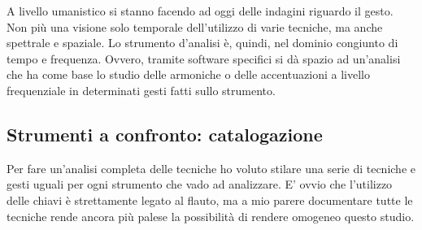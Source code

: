 A livello umanistico si stanno facendo ad oggi delle indagini riguardo il gesto.
Non più una visione solo temporale dell’utilizzo di varie tecniche, ma anche
spettrale e spaziale. Lo strumento d’analisi è, quindi, nel dominio congiunto
di tempo e frequenza. Ovvero, tramite software specifici si dà spazio ad
un’analisi che ha come base lo studio delle armoniche o delle accentuazioni a
livello frequenziale in determinati gesti fatti sullo strumento.

\subsection{Strumenti a confronto: catalogazione}

Per fare un’analisi completa delle tecniche ho voluto stilare una serie di
tecniche e gesti uguali per ogni strumento che vado ad analizzare. E’ ovvio che
l’utilizzo delle chiavi è strettamente legato al flauto, ma a mio parere
documentare tutte le tecniche rende ancora più palese la possibilità di rendere
omogeneo questo studio.

